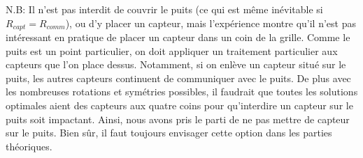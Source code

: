 \documentclass[12pt,a4paper]{article}
\begin{document}
N.B: Il n'est pas interdit de couvrir le puits (ce qui est même inévitable si $R_{capt}=R_{comm}$), ou d'y placer un capteur, mais l'expérience montre qu'il n'est pas intéressant en pratique de placer un capteur dans un coin de la grille. Comme le puits est un point particulier, on doit appliquer un traitement particulier aux capteurs que l'on place dessus.
 Notamment, si on enlève un capteur situé sur le puits, les autres capteurs continuent de communiquer avec le puits. De plus avec les nombreuses rotations et symétries possibles, il faudrait que toutes les solutions optimales aient des capteurs aux quatre coins pour qu'interdire un capteur sur le puits soit impactant. Ainsi, nous avons pris le parti de ne pas mettre de capteur sur le puits. Bien sûr, il faut toujours envisager cette option dans les parties théoriques. 
\end{document}

